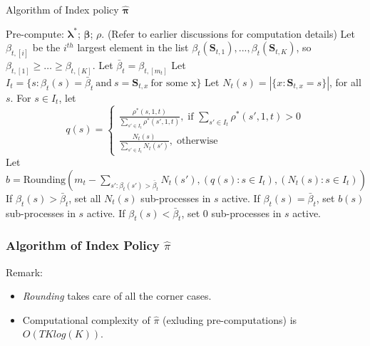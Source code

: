\documentclass{beamer}
\newcommand{\betav}{\pmb{\beta}}
\newcommand{\lambdav}{\pmb{\lambda}}
\newcommand{\allp}{\pmb{\pi}}
\newcommand{\allstater}{\mathbf{S}}
\newcommand{\substate}{s}
\begin{document}
\begin{frame}{Algorithm of Index policy $\hat{\allp}$}
\vspace{-0.3cm}
\begin{algorithm}[H]
\footnotesize
\begin{algorithmic}
\STATE Pre-compute: $\lambdav^*$; $\betav$; $\rho$. (Refer to earlier discussions for computation details) 
    \STATE Let $\beta_{t,[i]}$ be the $i^{th}$ largest element in the list $\beta_t(\allstater_{t,1}),...,\beta_t(\allstater_{t,K})$, so $\beta_{t,[1]}\geq\ldots\geq \beta_{t,[K]}$. 
    \STATE Let $\bar{\beta}_t = \beta_{t,[m_t]}$
    \STATE Let $I_t=\{\substate : \beta_t(s)=\bar{\beta}_t\ \text{and}\ s=\allstater_{t,x}\ \text{for some x}\}$
    \STATE Let $N_t(s) = |\{x:\allstater_{t,x}=s\}|$, for all $\substate$.
    \STATE For $\substate\in I_t$, let 
    $$
    q(s) = 
    \begin{cases}
	\frac{\rho^*(s,1,t)}{\sum_{s'\in I_t}\rho^*(s',1,t)}, \; \text{if } \sum_{s'\in I_t}\rho^*(s',1,t)>0\\
	\frac{N_t(s)}{\sum_{s'\in I_t} N_t(s')}, \; \text{otherwise}
    \end{cases}
    $$
    Let $b = \mathrm{Rounding}(m_t-\sum_{s':\beta_t(s')>\bar{\beta}_t}N_t(s'),
    (q(s):s\in I_t),(N_t(s):s\in I_t))$
    \FOR{all $\substate$}
    \STATE If $\beta_t(s)>\bar{\beta}_t$, set all $N_t(s)$ sub-processes in $s$ active.
    \STATE If $\beta_t(s)= \bar{\beta}_t$, set $b(s)$ sub-processes in $s$ active.
    \STATE If $\beta_t(s)< \bar{\beta}_t$, set 0 sub-processes in $s$ active.
    \ENDFOR
  \ENDFOR
\end{algorithmic}
\end{algorithm}

\end{frame}

\begin{frame}
\frametitle{Algorithm of Index Policy $\hat{\pi}$}
Remark:
\begin{itemize}
\item \textit{Rounding} takes care of all the corner cases.
\item Computational complexity of $\hat{\pi}$ (exluding pre-computations) is $O(TKlog(K))$.
\end{itemize}
\end{frame}
\end{document}
